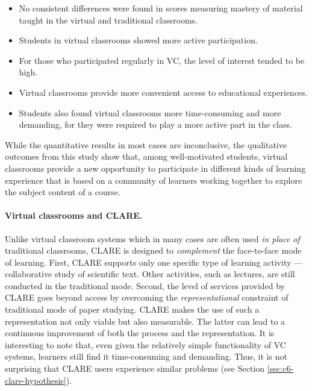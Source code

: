 \begin{itemize}
\item No consistent differences were found in scores measuring mastery of
  material taught in the virtual and traditional classrooms.
  
\item Students in virtual classrooms showed more active participation.
  
\item For those who participated regularly in VC, the level of interest
  tended to be high.
  
\item Virtual classrooms provide more convenient access to educational
  experiences.

\item Students also found virtual classrooms more time-consuming and more
  demanding, for they were required to play a more active part in the
  class.
\end{itemize}

While the quantitative results in most cases are inconclusive, the
qualitative outcomes from this study show that, among well-motivated
students, virtual classrooms provide a new opportunity to participate in
different kinds of learning experience that is based on a community of
learners working together to explore the subject content of a course.


\paragraph{Virtual classrooms and CLARE.}

Unlike virtual classroom systems which in many cases are often used {\it in
place of\/} traditional classrooms, CLARE is designed to {\it complement\/}
the face-to-face mode of learning. First, CLARE supports only one specific
type of learning activity --- collaborative study of scientific text. Other
activities, such as lectures, are still conducted in the traditional mode.
Second, the level of services provided by CLARE goes beyond access by
overcoming the {\it representational\/} constraint of traditional mode of
paper studying. CLARE makes the use of such a representation not only
viable but also measurable. The latter can lead to a continuous improvement
of both the process and the representation. It is interesting to note that,
even given the relatively simple functionality of VC systems, learners
still find it time-consuming and demanding. Thus, it is not surprising that
CLARE users experience similar problems (see Section
\ref{sec:c6-clare-hypothesis}).



